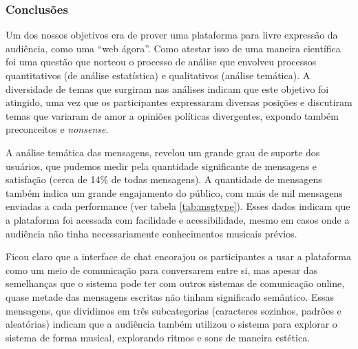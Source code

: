 \subsubsection{Conclusões}


Um dos nossos objetivos era de prover uma plataforma para livre expressão da audiência, como uma ``web ágora''. Como atestar isso de uma maneira científica foi uma questão que norteou o processo de análise que envolveu processos quantitativos (de análise estatística) e qualitativos (análise temática). A diversidade de temas que surgiram nas análises indicam que este objetivo foi atingido, uma vez que os participantes expressaram diversas posições e discutiram temas que variaram de amor a opiniões políticas divergentes, expondo também preconceitos e \emph{nonsense}.

A análise temática das mensagens, revelou um grande grau de suporte dos usuários, que pudemos medir pela quantidade significante de mensagens e satisfação (cerca de 14\% de todas mensagens). A quantidade de mensagens também indica um grande engajamento do público, com mais de mil mensagens enviadas a cada performance (ver tabela \ref{tab:msgtype}). Esses dados indicam que a plataforma foi acessada com facilidade e acessibilidade, mesmo em casos onde a audiência não tinha necessariamente conhecimentos musicais prévios. 



Ficou claro que a interface de chat encorajou os participantes a usar a plataforma como um meio de comunicação para conversarem entre si, mas apesar das semelhanças que o sistema pode ter com outros sistemas de comunicação online, quase metade das mensagens escritas não tinham significado semântico. Essas mensagens, que dividimos em três subcategorias (caracteres sozinhos, padrões e aleatórias) indicam que a audiência também utilizou o sistema para explorar o sistema de forma musical, explorando ritmos e sons de maneira estética.

